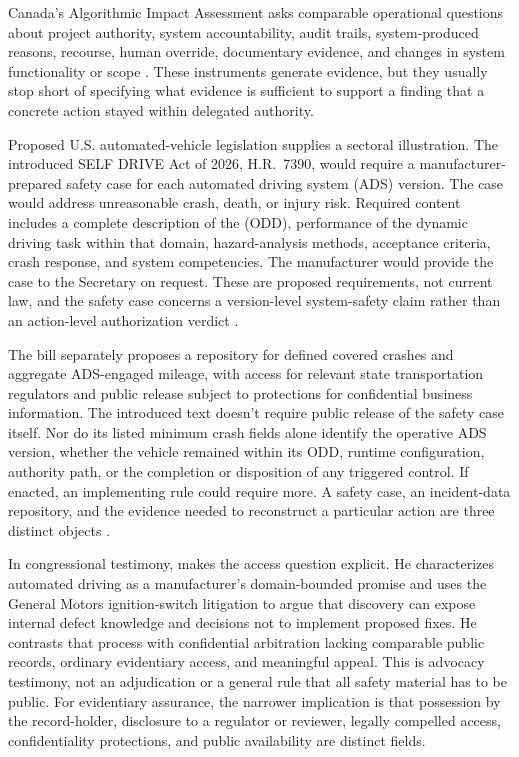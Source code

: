 Canada's Algorithmic Impact Assessment asks comparable operational questions about project authority, system accountability, audit trails, system-produced reasons, recourse, human override, documentary evidence, and changes in system functionality or scope \citep{canadaAIA2026}. These instruments generate evidence, but they usually stop short of specifying what evidence is sufficient to support a finding that a concrete action stayed within delegated authority.

Proposed U.S. automated-vehicle legislation supplies a sectoral illustration. The introduced SELF DRIVE Act of 2026, H.R.~7390, would require a manufacturer-prepared safety case for each automated driving system (ADS) version. The case would address unreasonable crash, death, or injury risk. Required content includes a complete description of the  (ODD), performance of the dynamic driving task within that domain, hazard-analysis methods, acceptance criteria, crash response, and system competencies. The manufacturer would provide the case to the Secretary on request. These are proposed requirements, not current law, and the safety case concerns a version-level system-safety claim rather than an action-level authorization verdict \citep{usCongress2026selfDriveAct}.

The bill separately proposes a repository for defined covered crashes and aggregate ADS-engaged mileage, with access for relevant state transportation regulators and public release subject to protections for confidential business information. The introduced text doesn't require public release of the safety case itself. Nor do its listed minimum crash fields alone identify the operative ADS version, whether the vehicle remained within its ODD, runtime configuration, authority path, or the completion or disposition of any triggered control. If enacted, an implementing rule could require more. A safety case, an incident-data repository, and the evidence needed to reconstruct a particular action are three distinct objects \citep{usCongress2026selfDriveAct}.

In congressional testimony, \textcite{hinkle2020autonomousVehiclesTestimony} makes the access question explicit. He characterizes automated driving as a manufacturer's domain-bounded promise and uses the General Motors ignition-switch litigation to argue that discovery can expose internal defect knowledge and decisions not to implement proposed fixes. He contrasts that process with confidential arbitration lacking comparable public records, ordinary evidentiary access, and meaningful appeal. This is advocacy testimony, not an adjudication or a general rule that all safety material has to be public. For evidentiary assurance, the narrower implication is that possession by the record-holder, disclosure to a regulator or reviewer, legally compelled access, confidentiality protections, and public availability are distinct fields.

